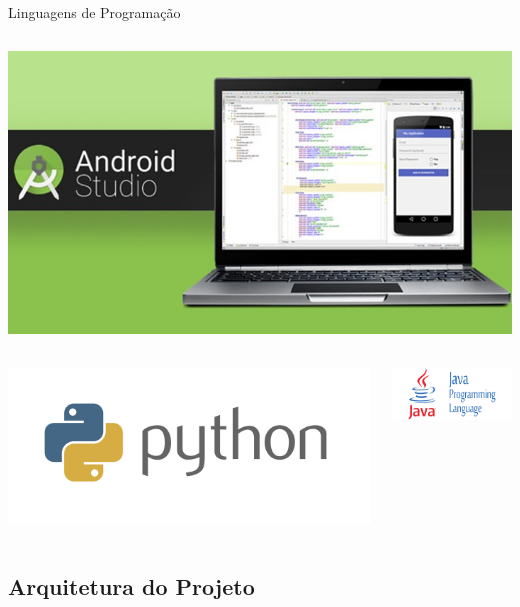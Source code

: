 \documentclass{beamer}
\begin{document}
\begin{frame}{Linguagens de Programação}
\begin{columns}
\begin{column}{0.4\textwidth}
\begin{center}
\includegraphics[width=.8\textwidth]{img/progr_android.jpg}    
\end{center}
\end{column}
\end{columns}
\begin{columns}
\begin{column}{0.6\textwidth}
\begin{center}
\includegraphics[width=.7\textwidth]{img/progr_python.png}   
\end{center}
\end{column}
\begin{column}{0.4\textwidth}
\begin{center}
\includegraphics[width=.8\textwidth]{img/progr_java.png}    
\end{center}
\end{column}
\end{columns}
\end{frame}


\subsection{Arquitetura do Projeto}
\end{document}
